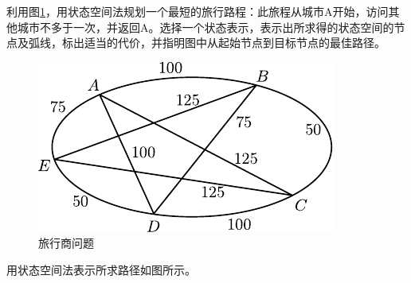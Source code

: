 \begin{question}
利用图\ref{Fig:TSP-problem}，用状态空间法规划一个最短的旅行路程：此旅程从城市A开始，访问其他城市不多于一次，并返回A。选择一个状态表示，表示出所求得的状态空间的节点及弧线，标出适当的代价，并指明图中从起始节点到目标节点的最佳路径。
	\begin{figure}[h]
		\centering
		\includegraphics{figures/ques-2.3.pdf}
		\caption{旅行商问题} \label{Fig:TSP-problem}
	\end{figure}
\end{question}
\begin{solution}
用状态空间法表示所求路径如图所示。
\end{solution}

